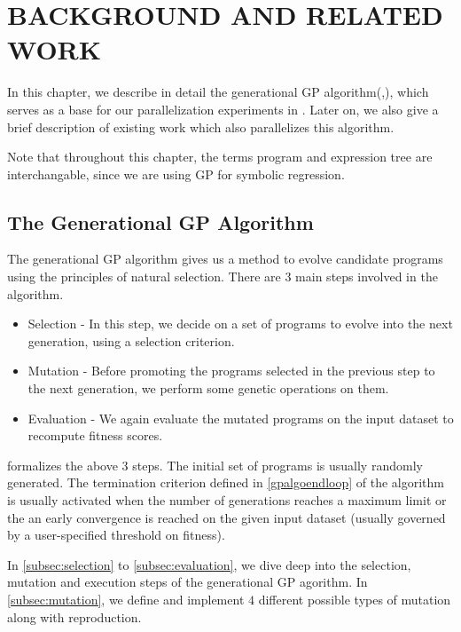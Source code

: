 \chapter{BACKGROUND AND RELATED WORK}
\label{chap:bgrw}
In this chapter, we describe in detail the generational GP algorithm(\citep{poli08:fieldguide},\citep{RFIgp2016}), which serves as a base for our parallelization experiments in . Later on, we also give a brief description of existing work which also parallelizes this algorithm.

Note that throughout this chapter, the terms program and expression tree are interchangable, since we are using GP for symbolic regression. 

\section{The Generational GP Algorithm}
\label{bgrw:algo}
The generational GP algorithm gives us a method to evolve candidate programs using the principles of natural selection. There are $3$ main steps involved in the algorithm. 
\begin{itemize}
  \item Selection - In this step, we decide on a set of programs to evolve into the next generation, using a selection criterion. 
  \item Mutation - Before promoting the programs selected in the previous step to the next generation, we perform some genetic operations on them. 
  \item Evaluation - We again evaluate the mutated programs on the input dataset to recompute fitness scores. 
\end{itemize}

 formalizes the above $3$ steps. The initial set of programs is usually randomly generated. The termination criterion defined in \cref*{gpalgoendloop} of the algorithm is usually activated when the number of generations reaches a maximum limit or the an early convergence is reached on the given input dataset (usually governed by a user-specified threshold on fitness).

In \cref*{subsec:selection} to \cref*{subsec:evaluation}, we dive deep into the selection, mutation and execution steps of the generational GP agorithm. In \cref*{subsec:mutation}, we define and implement $4$ different possible types of mutation along with reproduction.


